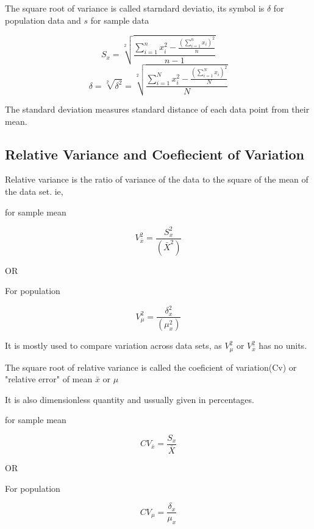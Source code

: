 \documentclass[12pt]{article}
\begin{document}
The square root of variance is called starndard deviatio, its symbol is $\delta$ for population data and $s$ for sample data

\begin{equation}
    S_x = \sqrt[2]{\frac{\sum_{i = 1}^{n} x_i^2 - \frac{(\sum_{i = 1}^{n}x_i)^2}{n}}{n-1}}
\end{equation}
\begin{equation}
    \delta = \sqrt[2]{\delta^2} = \sqrt[2]{\frac{\sum_{i = 1}^{N} x_i^2 - \frac{(\sum_{i = 1}^{N}x_i)^2}{N}}{N}}
\end{equation}

The standard deviation measures standard distance of each data point from their mean.
\subsection{Relative Variance and Coefiecient of Variation}

Relative variance is the ratio of variance of the data to the square of the mean of the data set. ie,
\begin{center}
    for sample mean
\end{center}
\begin{equation}
    V_{\bar{x}}^2 = \frac{S_x^2}{(\bar{X}^2)}
\end{equation}
\begin{center}
    OR
\end{center}
\begin{center}
    For population
\end{center}
\begin{equation}
    V_{\mu}^2 = \frac{\delta_x^2}{(\mu_x^2)}
\end{equation}

It is mostly used to compare variation across data sets, as $V_{\mu}^2$ or $V_{\bar{x}}^2$ has no units.

The square root of relative variance is called the coeficient of variation(Cv) or "relative error" of mean $\bar{x}$ or $\mu$

It is also dimensionless quantity and ussually given in percentages.

\begin{center}
    for sample mean
\end{center}
\begin{equation}
    CV_{\bar{x}} = \frac{S_x}{\bar{X}}
\end{equation}
\begin{center}
    OR
\end{center}
\begin{center}
    For population
\end{center}
\begin{equation}
    CV_{\mu} = \frac{\delta_x}{\mu_x}
\end{equation}
\end{document}
